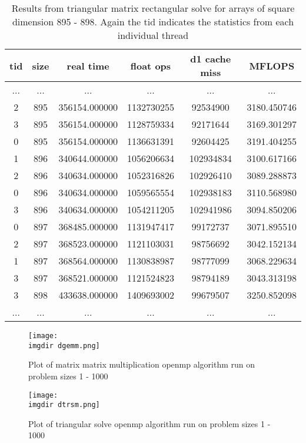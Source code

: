 \documentclass[a4paper,12pt]{article}
\def \imgdir {../img/}
\begin{document}
\begin{table}[!ht]
  \centering
  \caption{Results from triangular matrix rectangular solve for arrays of square dimension 895 - 898. Again the tid indicates the statistics from each individual thread}
  \label{tab:dtrsm}
  
  \vspace{3mm}
  \begin{tabular}{ c c c c c c }
    tid	& size & real time & float ops & d1 cache miss & MFLOPS \\ \hline
    ... & ... & ... & ... & ... & ... \\
    2 & 895 & 356154.000000 & 1132730255 & 92534900 & 3180.450746  \\
    3 & 895 & 356154.000000 & 1128759334 & 92171644 & 3169.301297  \\
    0 & 895 & 356154.000000 & 1136631391 & 92604425 & 3191.404255  \\
    1 & 896 & 340644.000000 & 1056206634 & 102934834 & 3100.617166 \\
    2 & 896 & 340634.000000 & 1052316826 & 102926410 & 3089.288873 \\
    0 & 896 & 340634.000000 & 1059565554 & 102938183 & 3110.568980 \\
    3 & 896 & 340634.000000 & 1054211205 & 102941986 & 3094.850206 \\
    0 & 897 & 368485.000000 & 1131947417 & 99172737 & 3071.895510  \\
    2 & 897 & 368523.000000 & 1121103031 & 98756692 & 3042.152134  \\
    1 & 897 & 368564.000000 & 1130838987 & 98777099 & 3068.229634  \\
    3 & 897 & 368521.000000 & 1121524823 & 98794189 & 3043.313198  \\
    3 & 898 & 433638.000000 & 1409693002 & 99679507 & 3250.852098 \\
    ... & ... & ... & ... & ... & ...
  \end{tabular}
\end{table}

\begin{figure}[!ht]
  \centering
  \texttt{[image: \\imgdir dgemm.png]}
  \caption{Plot of matrix matrix multiplication openmp algorithm run on problem sizes 1 - 1000}
  \label{fig:dgemm}
\end{figure}

\begin{figure}[!ht]
  \centering
  \texttt{[image: \\imgdir dtrsm.png]}
  \caption{Plot of triangular solve openmp algorithm run on problem sizes 1 - 1000}
  \label{fig:dtrsm}
\end{figure}
\end{document}
